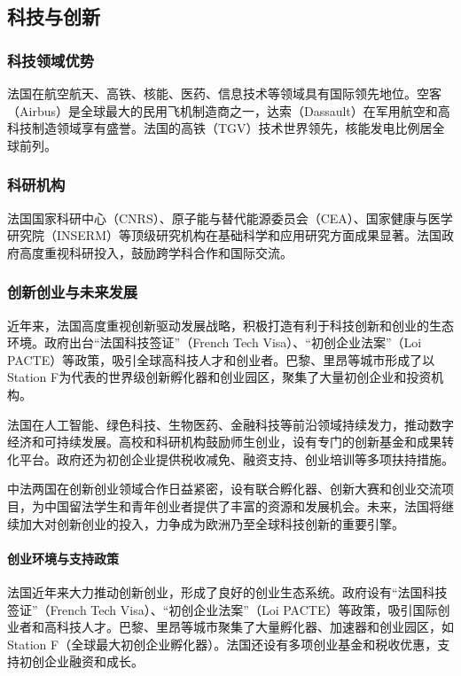 \subsection{科技与创新}

\subsubsection{科技领域优势}

法国在航空航天、高铁、核能、医药、信息技术等领域具有国际领先地位。空客（Airbus）是全球最大的民用飞机制造商之一，达索（Dassault）在军用航空和高科技制造领域享有盛誉。法国的高铁（TGV）技术世界领先，核能发电比例居全球前列。

\subsubsection{科研机构}

法国国家科研中心（CNRS）、原子能与替代能源委员会（CEA）、国家健康与医学研究院（INSERM）等顶级研究机构在基础科学和应用研究方面成果显著。法国政府高度重视科研投入，鼓励跨学科合作和国际交流。

\subsubsection{创新创业与未来发展}

近年来，法国高度重视创新驱动发展战略，积极打造有利于科技创新和创业的生态环境。政府出台“法国科技签证”（French Tech Visa）、“初创企业法案”（Loi PACTE）等政策，吸引全球高科技人才和创业者。巴黎、里昂等城市形成了以Station F为代表的世界级创新孵化器和创业园区，聚集了大量初创企业和投资机构。

法国在人工智能、绿色科技、生物医药、金融科技等前沿领域持续发力，推动数字经济和可持续发展。高校和科研机构鼓励师生创业，设有专门的创新基金和成果转化平台。政府还为初创企业提供税收减免、融资支持、创业培训等多项扶持措施。

中法两国在创新创业领域合作日益紧密，设有联合孵化器、创新大赛和创业交流项目，为中国留法学生和青年创业者提供了丰富的资源和发展机会。未来，法国将继续加大对创新创业的投入，力争成为欧洲乃至全球科技创新的重要引擎。

\paragraph{创业环境与支持政策}
法国近年来大力推动创新创业，形成了良好的创业生态系统。政府设有“法国科技签证”（French Tech Visa）、“初创企业法案”（Loi PACTE）等政策，吸引国际创业者和高科技人才。巴黎、里昂等城市聚集了大量孵化器、加速器和创业园区，如Station F（全球最大初创企业孵化器）。法国还设有多项创业基金和税收优惠，支持初创企业融资和成长。

